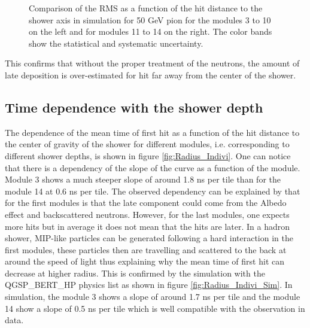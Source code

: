 \begin{figure}[htbp!]
\begin{subfigure}[t]{0.49\textwidth}
		\caption{} \label{fig:Radius_RMS_BL_SimData_50GeV}
	\end{subfigure}
	\caption{Comparison of the RMS as a function of the hit distance to the shower axis in \mokka simulation for 50 GeV pion for the modules 3 to 10 on the left and for modules 11 to 14 on the right. The color bands show the statistical and systematic uncertainty.}
	\label{fig:Radius_RMS_SimData_50GeVComparison}
\end{figure}

This confirms that without the proper treatment of the neutrons, the amount of late deposition is over-estimated for hit far away from the center of the shower.

\subsection{Time dependence with the shower depth}
\label{sec:TimeRadiusDepth}

The dependence of the mean time of first hit as a function of the hit distance to the center of gravity of the shower for different modules, i.e. corresponding to different shower depths, is shown in figure \ref{fig:Radius_Indivi}. One can notice that there is a dependency of the slope of the curve as a function of the module. Module 3 shows a much steeper slope of around 1.8 ns per tile than for the module 14 at 0.6 ns per tile. The observed dependency can be explained by that for the first modules is that the late component could come from the Albedo effect \cite{ELLSWORTH1982167} and backscattered neutrons. However, for the last modules, one expects more hits but in average it does not mean that the hits are later. In a hadron shower, MIP-like particles can be generated following a hard interaction in the first modules, these particles then are travelling and scattered to the back at around the speed of light thus explaining why the mean time of first hit can decrease at higher radius. This is confirmed by the simulation with the QGSP\_BERT\_HP physics list as shown in figure \ref{fig:Radius_Indivi_Sim}. In simulation, the module 3 shows a slope of around 1.7 ns per tile and the module 14 show a slope of 0.5 ns per tile which is well compatible with the observation in data.

